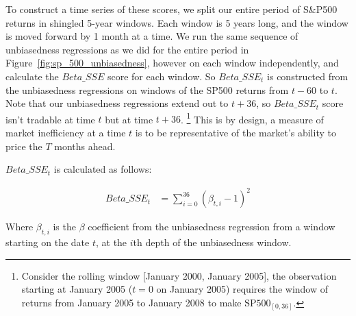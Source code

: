 To construct a time series of these scores, we split our entire period of S\&P500 returns in shingled 5-year windows. Each window is 5 years long, and the window is moved forward by 1 month at a time.
We run the same sequence of unbiasedness regressions as we did for the entire period in Figure~\ref{fig:sp_500_unbiasedness}, however on each window independently, and calculate the $Beta\_SSE$ score for each window.
So $Beta\_SSE_t$ is constructed from the unbiasedness regressions on windows of the SP500 returns from $t-60$ to $t$.
 Note that our unbiasedness regressions extend out to $t+36$, so $Beta\_SSE_t$ score isn't tradable at time $t$ but at time $t+36$.
\footnote{Consider the rolling window [January 2000, January 2005], the observation starting at January 2005 ($t=0$ on January 2005) requires the window of returns from January 2005 to January 2008 to make $\mathrm{SP500}_{[0, 36]}$.}
This is by design, a measure of market inefficiency at a time $t$ is to be representative of the market's ability to price the $T$ months ahead.

$Beta\_SSE_t$ is calculated as follows:

\begin{equation}
    \begin{aligned}
        Beta\_SSE_t &= \sum_{i=0}^{36} (\beta_{t,i} - 1)^2
    \end{aligned}
\end{equation}
\label{eq:beta_sse}

Where $\beta_{t,i}$ is the $\beta$ coefficient from the unbiasedness regression from a 
window starting on the date $t$, at the $i$th depth of the unbiasedness window.


